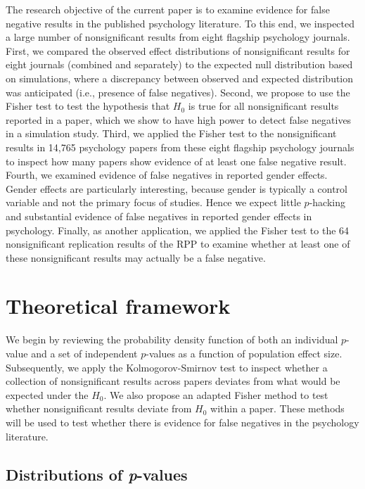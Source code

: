 \documentclass{article}
\begin{document}
The research objective of the current paper is to examine evidence for false negative results in the published psychology literature. To this end, we inspected a large number of nonsignificant results from eight flagship psychology journals. First, we compared the observed effect distributions of nonsignificant results for eight journals (combined and separately) to the expected null distribution based on simulations, where a discrepancy between observed and expected distribution was anticipated (i.e., presence of false negatives). Second, we propose to use the Fisher test to test the hypothesis that $H_0$ is true for all nonsignificant results reported in a paper, which we show to have high power to detect false negatives in a simulation study. Third, we applied the Fisher test to the nonsignificant results in 14,765 psychology papers from these eight flagship psychology journals to inspect how many papers show evidence of at least one false negative result. Fourth, we examined evidence of false negatives in reported gender effects. Gender effects are particularly interesting, because gender is typically a control variable and not the primary focus of studies. Hence we expect little $p$-hacking and substantial evidence of false negatives in reported gender effects in psychology. Finally, as another application, we applied the Fisher test to the 64 nonsignificant replication results of the RPP \cite{Open_Science_Collaboration2015-zs} to examine whether at least one of these nonsignificant results may actually be a false negative. 

\section*{Theoretical framework}

We begin by reviewing the probability density function of both an individual $p$-value and a set of independent $p$-values as a function of population effect size. Subsequently, we apply the Kolmogorov-Smirnov test to inspect whether a collection of nonsignificant results across papers deviates from what would be expected under the $H_0$. We also propose an adapted Fisher method to test whether nonsignificant results deviate from $H_0$ within a paper. These methods will be used to test whether there is evidence for false negatives in the psychology literature.

\subsection*{Distributions of \textit{p}-values}
\end{document}
